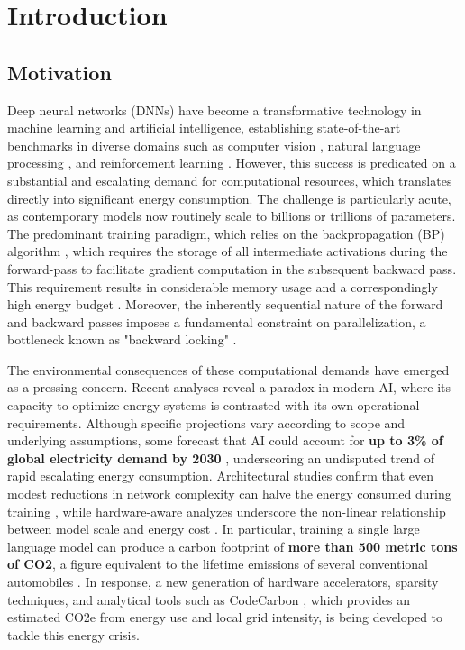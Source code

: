\section{Introduction}
\label{chap:introduction}

\subsection{Motivation}
\label{sec:motivation}

Deep neural networks (DNNs) have become a transformative technology in machine learning and artificial intelligence, establishing state-of-the-art benchmarks in diverse domains such as computer vision \cite{krizhevsky2012imagenet, he2016deep}, natural language processing \cite{vaswani2017attention, devlin2018bert}, and reinforcement learning \cite{mnih2015human}. However, this success is predicated on a substantial and escalating demand for computational resources, which translates directly into significant energy consumption. The challenge is particularly acute, as contemporary models now routinely scale to billions or trillions of parameters. The predominant training paradigm, which relies on the backpropagation (BP) algorithm \cite{rumelhart1986learning}, which requires the storage of all intermediate activations during the forward-pass to facilitate gradient computation in the subsequent backward pass. This requirement results in considerable memory usage and a correspondingly high energy budget \cite{chen2016training}. Moreover, the inherently sequential nature of the forward and backward passes imposes a fundamental constraint on parallelization, a bottleneck known as "backward locking" \cite{jaderberg2017decoupled}.

The environmental consequences of these computational demands have emerged as a pressing concern. Recent analyses reveal a paradox in modern AI, where its capacity to optimize energy systems is contrasted with its own operational requirements. Although specific projections vary according to scope and underlying assumptions, some forecast that AI could account for \textbf{up to 3\% of global electricity demand by 2030} \cite{wef2025paradox}, underscoring an undisputed trend of rapid escalating energy consumption. Architectural studies confirm that even modest reductions in network complexity can halve the energy consumed during training \cite{yarally2023uncovering}, while hardware-aware analyzes underscore the non-linear relationship between model scale and energy cost \cite{desislavov2024energy}. In particular, training a single large language model can produce a carbon footprint of \textbf{more than 500 metric tons of CO2}, a figure equivalent to the lifetime emissions of several conventional automobiles \cite{patterson2021carbon, abbas2024impact}. In response, a new generation of hardware accelerators, sparsity techniques, and analytical tools such as CodeCarbon \cite{codecarbon2021}, which provides an estimated CO2e from energy use and local grid intensity, is being developed to tackle this energy crisis.

